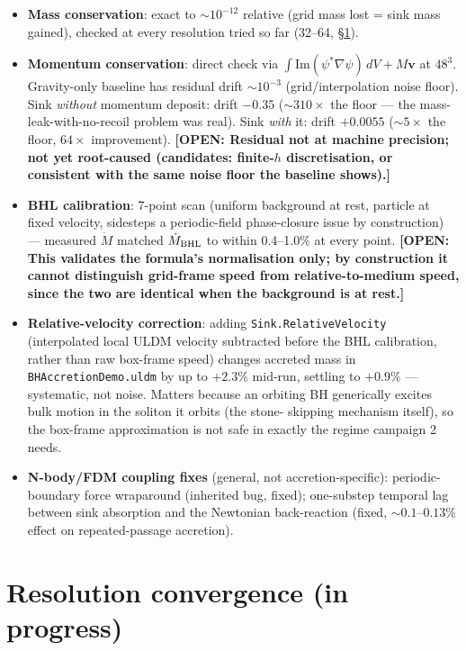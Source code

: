 \documentclass[11pt]{article}
\newcommand{\code}[1]{\texttt{#1}}
\newcommand{\OPEN}[1]{\textcolor{orange!80!black}{\textbf{[OPEN: #1]}}}
\begin{document}
\begin{itemize}
  \item \textbf{Mass conservation}: exact to $\sim 10^{-12}$ relative
    (grid mass lost = sink mass gained), checked at every resolution tried
    so far (32--64, \S\ref{sec:convergence}).
  \item \textbf{Momentum conservation}: direct check via
    $\int\mathrm{Im}(\psi^*\nabla\psi)\,dV + M\mathbf v$ at $48^3$. Gravity-only
    baseline has residual drift $\sim10^{-3}$ (grid/interpolation noise
    floor). Sink \emph{without} momentum deposit: drift $-0.35$
    ($\sim310\times$ the floor — the mass-leak-with-no-recoil problem was
    real). Sink \emph{with} it: drift $+0.0055$ ($\sim5\times$ the floor,
    $64\times$ improvement). \OPEN{Residual not at machine precision; not
    yet root-caused (candidates: finite-$h$ discretisation, or consistent
    with the same noise floor the baseline shows).}
  \item \textbf{BHL calibration}: 7-point scan (uniform background at rest,
    particle at fixed velocity, sidesteps a periodic-field phase-closure
    issue by construction) — measured $\dot M$ matched
    $\dot M_{\rm BHL}$ to within 0.4--1.0\% at every point. \OPEN{This
    validates the formula's normalisation only; by construction it cannot
    distinguish grid-frame speed from relative-to-medium speed, since the
    two are identical when the background is at rest.}
  \item \textbf{Relative-velocity correction}: adding \code{Sink.RelativeVelocity}
    (interpolated local ULDM velocity subtracted before the BHL calibration,
    rather than raw box-frame speed) changes accreted mass in
    \code{BHAccretionDemo.uldm} by up to $+2.3\%$ mid-run, settling to
    $+0.9\%$ — systematic, not noise. Matters because an orbiting BH
    generically excites bulk motion in the soliton it orbits (the stone-
    skipping mechanism itself), so the box-frame approximation is not safe
    in exactly the regime campaign 2 needs.
  \item \textbf{N-body/FDM coupling fixes} (general, not accretion-specific):
    periodic-boundary force wraparound (inherited bug, fixed); one-substep
    temporal lag between sink absorption and the Newtonian back-reaction
    (fixed, $\sim0.1$--$0.13\%$ effect on repeated-passage accretion).
\end{itemize}

\section{Resolution convergence (in progress)}
\label{sec:convergence}
\end{document}
